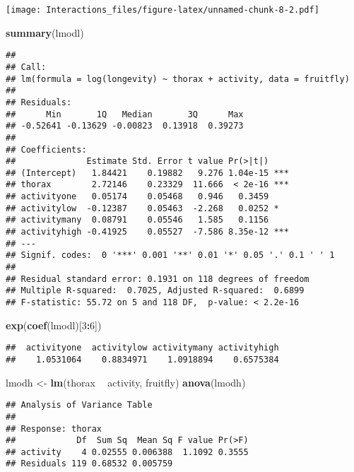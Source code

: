 \documentclass[
]{article}
\newenvironment{Shaded}{\begin{snugshade}}{\end{snugshade}}
\newcommand{\DecValTok}[1]{\textcolor[rgb]{0.00,0.00,0.81}{#1}}
\newcommand{\KeywordTok}[1]{\textcolor[rgb]{0.13,0.29,0.53}{\textbf{#1}}}
\newcommand{\NormalTok}[1]{#1}
\newcommand{\OperatorTok}[1]{\textcolor[rgb]{0.81,0.36,0.00}{\textbf{#1}}}
\newcommand{\StringTok}[1]{\textcolor[rgb]{0.31,0.60,0.02}{#1}}
\begin{document}
\texttt{[image: Interactions\_files/figure-latex/unnamed-chunk-8-2.pdf]}

\begin{Shaded}
\begin{Highlighting}[]
\KeywordTok{summary}\NormalTok{(lmodl)}
\end{Highlighting}
\end{Shaded}

\begin{verbatim}
## 
## Call:
## lm(formula = log(longevity) ~ thorax + activity, data = fruitfly)
## 
## Residuals:
##      Min       1Q   Median       3Q      Max 
## -0.52641 -0.13629 -0.00823  0.13918  0.39273 
## 
## Coefficients:
##              Estimate Std. Error t value Pr(>|t|)    
## (Intercept)   1.84421    0.19882   9.276 1.04e-15 ***
## thorax        2.72146    0.23329  11.666  < 2e-16 ***
## activityone   0.05174    0.05468   0.946   0.3459    
## activitylow  -0.12387    0.05463  -2.268   0.0252 *  
## activitymany  0.08791    0.05546   1.585   0.1156    
## activityhigh -0.41925    0.05527  -7.586 8.35e-12 ***
## ---
## Signif. codes:  0 '***' 0.001 '**' 0.01 '*' 0.05 '.' 0.1 ' ' 1
## 
## Residual standard error: 0.1931 on 118 degrees of freedom
## Multiple R-squared:  0.7025, Adjusted R-squared:  0.6899 
## F-statistic: 55.72 on 5 and 118 DF,  p-value: < 2.2e-16
\end{verbatim}

\begin{Shaded}
\begin{Highlighting}[]
\KeywordTok{exp}\NormalTok{(}\KeywordTok{coef}\NormalTok{(lmodl)[}\DecValTok{3}\OperatorTok{:}\DecValTok{6}\NormalTok{])}
\end{Highlighting}
\end{Shaded}

\begin{verbatim}
##  activityone  activitylow activitymany activityhigh 
##    1.0531064    0.8834971    1.0918894    0.6575384
\end{verbatim}

\begin{Shaded}
\begin{Highlighting}[]
\NormalTok{lmodh <-}\StringTok{ }\KeywordTok{lm}\NormalTok{(thorax }\OperatorTok{~}\StringTok{ }\NormalTok{activity, fruitfly)}
\KeywordTok{anova}\NormalTok{(lmodh)}
\end{Highlighting}
\end{Shaded}

\begin{verbatim}
## Analysis of Variance Table
## 
## Response: thorax
##            Df  Sum Sq  Mean Sq F value Pr(>F)
## activity    4 0.02555 0.006388  1.1092 0.3555
## Residuals 119 0.68532 0.005759
\end{verbatim}
\end{document}
